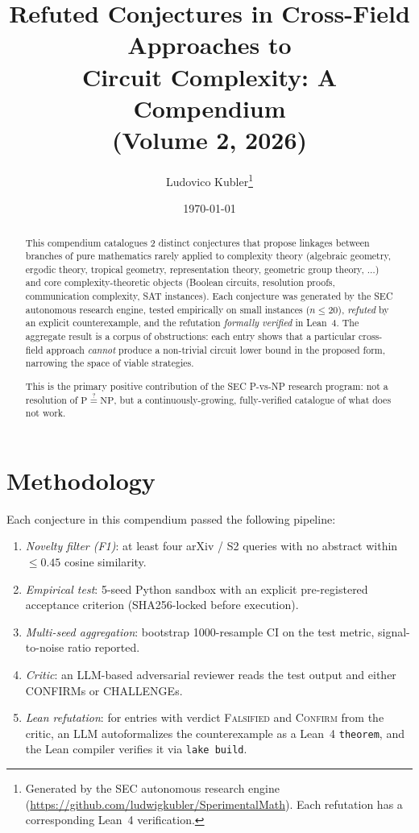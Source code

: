 \documentclass[11pt,a4paper]{article}
\title{Refuted Conjectures in Cross-Field Approaches to\\
Circuit Complexity: A Compendium\\[1ex]
\large(Volume 2, 2026)}
\author{Ludovico Kubler\thanks{Generated by the SEC autonomous research engine
(\url{https://github.com/ludwigkubler/SperimentalMath}).
Each refutation has a corresponding Lean~4 verification.}}
\date{\today}
\begin{document}
\maketitle

\begin{abstract}
This compendium catalogues 2 distinct conjectures that propose linkages
between branches of pure mathematics rarely applied to complexity theory
(algebraic geometry, ergodic theory, tropical geometry, representation
theory, geometric group theory, $\dots$) and core complexity-theoretic
objects (Boolean circuits, resolution proofs, communication complexity,
SAT instances). Each conjecture was generated by the SEC autonomous
research engine, tested empirically on small instances ($n\le 20$),
\emph{refuted} by an explicit counterexample, and the refutation
\emph{formally verified} in Lean~4. The aggregate result is a corpus of
obstructions: each entry shows that a particular cross-field approach
\emph{cannot} produce a non-trivial circuit lower bound in the proposed
form, narrowing the space of viable strategies.

This is the primary positive contribution of the SEC P-vs-NP research
program: not a resolution of $\mathrm{P}\stackrel{?}{=}\mathrm{NP}$, but
a continuously-growing, fully-verified catalogue of what does not work.
\end{abstract}


\section{Methodology}
Each conjecture in this compendium passed the following pipeline:

\begin{enumerate}
  \item \emph{Novelty filter (F1)}: at least four arXiv / S2 queries with
    no abstract within $\le 0.45$ cosine similarity.
  \item \emph{Empirical test}: 5-seed Python sandbox with an explicit
    pre-registered acceptance criterion (SHA256-locked before execution).
  \item \emph{Multi-seed aggregation}: bootstrap 1000-resample CI on the
    test metric, signal-to-noise ratio reported.
  \item \emph{Critic}: an LLM-based adversarial reviewer reads the test
    output and either CONFIRMs or CHALLENGEs.
  \item \emph{Lean refutation}: for entries with verdict
    \textsc{Falsified} and \textsc{Confirm} from the critic, an LLM
    autoformalizes the counterexample as a Lean~4 \texttt{theorem}, and
    the Lean compiler verifies it via \texttt{lake build}.
\end{enumerate}
\end{document}
